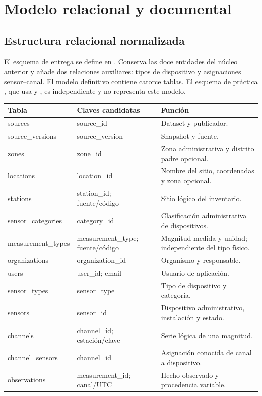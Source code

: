 \section{Modelo relacional y documental}
\subsection{Estructura relacional normalizada}
El esquema de entrega se define en
 \cite{pg3nf}. Conserva las doce entidades del
núcleo anterior y añade dos relaciones auxiliares: tipos de dispositivo y
asignaciones sensor--canal. El modelo definitivo contiene catorce tablas.
El esquema de práctica , que usa  y
, es independiente y no representa este modelo.

\begin{longtable}{>{\raggedright\arraybackslash}p{}>{\raggedright\arraybackslash}p{}>{\raggedright\arraybackslash}p{}}
\toprule Tabla & Claves candidatas & Función \\
\midrule\endhead
sources & source\_id & Dataset y publicador. \\
source\_versions & source\_version & Snapshot y fuente. \\
zones & zone\_id & Zona administrativa y distrito padre opcional. \\
locations & location\_id & Nombre del sitio, coordenadas y zona opcional. \\
stations & station\_id; fuente/código & Sitio lógico del inventario. \\
sensor\_categories & category\_id & Clasificación administrativa de dispositivos. \\
measurement\_types & measurement\_type; fuente/código & Magnitud medida y unidad; independiente del tipo físico. \\
organizations & organization\_id & Organismo y responsable. \\
users & user\_id; email & Usuario de aplicación. \\
sensor\_types & sensor\_type & Tipo de dispositivo y categoría. \\
sensors & sensor\_id & Dispositivo administrativo, instalación y estado. \\
channels & channel\_id; estación/clave & Serie lógica de una magnitud. \\
channel\_sensors & channel\_id & Asignación conocida de canal a dispositivo. \\
observations & measurement\_id; canal/UTC & Hecho observado y procedencia variable. \\
\bottomrule
\end{longtable}

